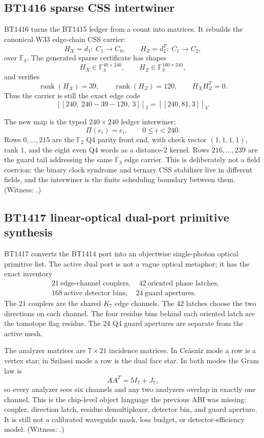 \documentclass[11pt]{article}
\begin{document}
\subsection{BT1416 sparse CSS intertwiner}

BT1416 turns the BT1415 ledger from a count into matrices.  It rebuilds the
canonical W33 edge-chain CSS carrier:
\[
  H_X=d_1:\ C_1\rightarrow C_0,\qquad
  H_Z=d_2^T:\ C_1\rightarrow C_2,
\]
over \(\mathbb F_3\).  The generated sparse certificate has shapes
\[
  H_X\in\mathbb F_3^{40\times240},\qquad
  H_Z\in\mathbb F_3^{160\times240},
\]
and verifies
\[
  \operatorname{rank}(H_X)=39,\qquad
  \operatorname{rank}(H_Z)=120,\qquad
  H_XH_Z^T=0.
\]
Thus the carrier is still the exact edge code
\[
  [[240,\ 240-39-120,\ 3]]_3=[[240,81,3]]_3.
\]

The new map is the typed \(240\times240\) ledger interwiner:
\[
  \Pi(e_i)=e_i,\qquad 0\leq i<240.
\]
Rows \(0,\ldots,215\) are the \(\mathbb F_2\) Q4 parity front end, with
check vector \((1,1,1,1)\), rank \(1\), and the eight even Q4 words as a
distance-\(2\) kernel.  Rows \(216,\ldots,239\) are the guard tail addressing
the same \(\mathbb F_3\) edge carrier.  This is deliberately not a field
coercion: the binary clock syndrome and ternary CSS stabilizer live in different
fields, and the interwiner is the finite scheduling boundary between them.
(Witness: .)

\subsection{BT1417 linear-optical dual-port primitive synthesis}

BT1417 converts the BT1414 port into an objectwise single-photon optical
primitive list.  The active dual port is not a vague optical metaphor; it has
the exact inventory
\begin{align*}
  &21\ \text{edge-channel couplers},\quad
  42\ \text{oriented phase latches},\\
  &168\ \text{active detector bins},\quad
  24\ \text{guard apertures}.
\end{align*}
The \(21\) couplers are the shared \(K_7\) edge channels.  The \(42\) latches
choose the two directions on each channel.  The four residue bins behind each
oriented latch are the tomotope flag residue.  The \(24\) Q4 guard apertures are
separate from the active mesh.

The analyzer matrices are \(7\times21\) incidence matrices.  In Cs\'asz\'ar
mode a row is a vertex star; in Szilassi mode a row is the dual face star.  In
both modes the Gram law is
\[
  AA^T = 5I_7 + J_7,
\]
so every analyzer sees six channels and any two analyzers overlap in exactly
one channel.  This is the chip-level object language the previous ABI was
missing: coupler, direction latch, residue demultiplexer, detector bin, and
guard aperture.  It is still not a calibrated waveguide mask, loss budget, or
detector-efficiency model.  (Witness:
.)
\end{document}
